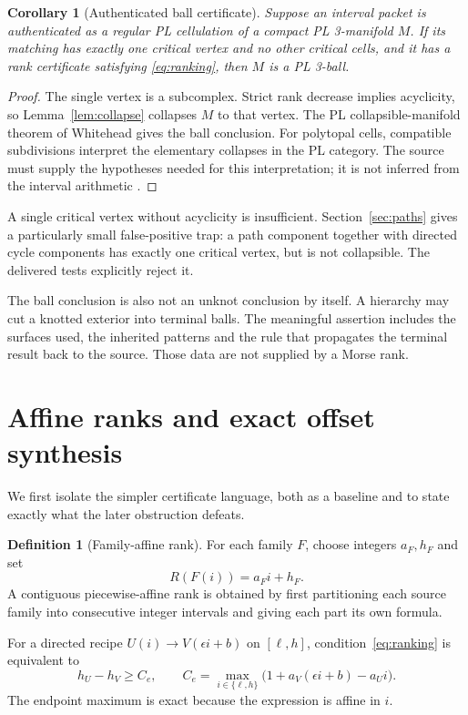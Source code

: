 \documentclass[11pt,letterpaper]{article}
\newtheorem{corollary}[theorem]{Corollary}
\theoremstyle{definition}
\newtheorem{definition}[theorem]{Definition}
\theoremstyle{remark}\newtheorem{remark}[theorem]{Remark}
\begin{document}
\begin{corollary}[Authenticated ball certificate]
\label{cor:ball}
Suppose an interval packet is authenticated as a regular PL cellulation of a compact PL 3-manifold $M$. If its matching has exactly one critical vertex and no other critical cells, and it has a rank certificate satisfying \eqref{eq:ranking}, then $M$ is a PL 3-ball.
\end{corollary}
\begin{proof}
The single vertex is a subcomplex. Strict rank decrease implies acyclicity, so Lemma~\ref{lem:collapse} collapses $M$ to that vertex. The PL collapsible-manifold theorem of Whitehead gives the ball conclusion. For polytopal cells, compatible subdivisions interpret the elementary collapses in the PL category. The source must supply the hypotheses needed for this interpretation; it is not inferred from the interval arithmetic \cite{whitehead,abl}.
\end{proof}

A single critical vertex without acyclicity is insufficient. Section~\ref{sec:paths} gives a particularly small false-positive trap: a path component together with directed cycle components has exactly one critical vertex, but is not collapsible. The delivered tests explicitly reject it.

The ball conclusion is also not an unknot conclusion by itself. A hierarchy may cut a knotted exterior into terminal balls. The meaningful assertion includes the surfaces used, the inherited patterns and the rule that propagates the terminal result back to the source. Those data are not supplied by a Morse rank.

\section{Affine ranks and exact offset synthesis}
\label{sec:affine}

We first isolate the simpler certificate language, both as a baseline and to state exactly what the later obstruction defeats.

\begin{definition}[Family-affine rank]
For each family $F$, choose integers $a_F,h_F$ and set
\[
                         R(F(i))=a_F i+h_F.
\]
A contiguous piecewise-affine rank is obtained by first partitioning each source family into consecutive integer intervals and giving each part its own formula.
\end{definition}

For a directed recipe $U(i)\to V(\epsilon i+b)$ on $[\ell,h]$, condition~\eqref{eq:ranking} is equivalent to
\begin{equation}
 h_U-h_V\geq C_e,
 \qquad
 C_e=\max_{i\in\{\ell,h\}}
             \bigl(1+a_V(\epsilon i+b)-a_U i\bigr).
 \label{eq:affineconstraint}
\end{equation}
The endpoint maximum is exact because the expression is affine in $i$.
\end{document}
